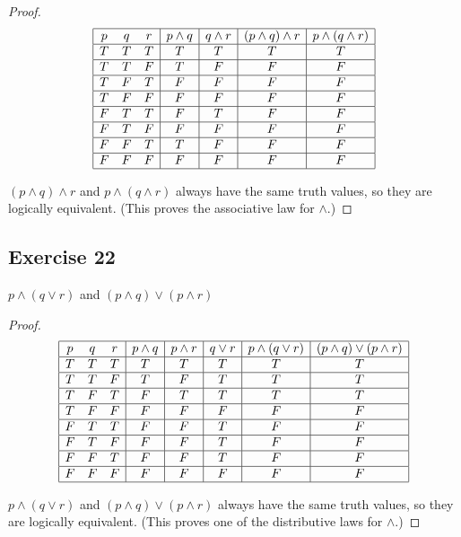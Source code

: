 \documentclass[14pt]{extarticle}
\begin{document}
\begin{proof}
$$
\begin{array}{|ccc|c|c|c|c|}
\hline
p & q & r & p \wedge q & q \wedge r & (p \wedge q) \wedge r &
p \wedge (q \wedge r) \\
\hline
T & T & T & T & T & T & T \\
\hline
T & T & F & T & F & F & F \\
\hline
T & F & T & F & F & F & F \\
\hline
T & F & F & F & F & F & F \\
\hline
F & T & T & F & T & F & F \\
\hline
F & T & F & F & F & F & F \\
\hline
F & F & T & T & F & F & F \\
\hline
F & F & F & F & F & F & F \\
\hline
\end{array}
$$

$(p \wedge q) \wedge r$ and $p \wedge (q \wedge r)$ always have the same truth
values, so they are logically equivalent. (This proves the associative law for
$\wedge$.)
\end{proof}

\subsection{Exercise 22}
$p \wedge (q \vee r)$ and $(p \wedge q) \vee (p \wedge r)$

\begin{proof}
$$
\begin{array}{|ccc|c|c|c|c|c|}
\hline
p & q & r & p \wedge q & p \wedge r & q \vee r & p \wedge (q \vee r) &
(p \wedge q) \vee (p \wedge r) \\
\hline
T & T & T & T & T & T & T & T \\
\hline
T & T & F & T & F & T & T & T \\
\hline
T & F & T & F & T & T & T & T \\
\hline
T & F & F & F & F & F & F & F \\
\hline
F & T & T & F & F & T & F & F \\
\hline
F & T & F & F & F & T & F & F \\
\hline
F & F & T & F & F & T & F & F \\
\hline
F & F & F & F & F & F & F & F \\
\hline
\end{array}
$$

$p \wedge (q \vee r)$ and $(p \wedge q) \vee (p \wedge r)$ always have the same
truth values, so they are logically equivalent. (This proves one of the
distributive laws for $\wedge$.)
\end{proof}
\end{document}
